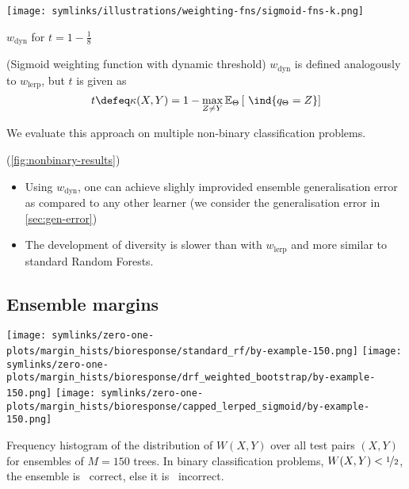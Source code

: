\documentclass[../main.tex]{subfiles}
\begin{document}
\begin{marginfigure}
    \texttt{[image: symlinks/illustrations/weighting-fns/sigmoid-fns-k.png]}
    \caption{ $w_\text{dyn}$ for     $t = 1 - \frac{1}{8}$}
\end{marginfigure}
\begin{definition} (Sigmoid weighting function with dynamic threshold)
    $w_\text{dyn}$ is defined analogously to $w_\text{lerp}$, but $t$ is given as
    $$
    t \defeq \kappa(X,Y) = 1 - \max_{Z \not= Y} \mathbb{E}_{\Theta}\left[ ~\ind{q_{\Theta} = Z} \right] 
    $$
\end{definition}

We evaluate this approach on multiple non-binary classification problems.


\begin{observation}  (\cf \cref{fig:nonbinary-results})
     \begin{itemize}
        \item Using $w_\text{dyn}$, one can achieve slighly improvided ensemble generalisation error as compared to any other learner (we consider the generalisation error in \cref{sec:gen-error})
        \item The development of diversity is slower than with $w_\text{lerp}$ and more similar to standard Random Forests.
     \end{itemize}
\end{observation}

\subsection{Ensemble margins}

\begin{marginfigure}
    \texttt{[image: symlinks/zero-one-plots/margin\_hists/bioresponse/standard\_rf/by-example-150.png]}
    \texttt{[image: symlinks/zero-one-plots/margin\_hists/bioresponse/drf\_weighted\_bootstrap/by-example-150.png]}
    \texttt{[image: symlinks/zero-one-plots/margin\_hists/bioresponse/capped\_lerped\_sigmoid/by-example-150.png]}
    \caption{
        Frequency histogram of the distribution of $W(X,Y)$ over all test pairs $(X,Y)$ for ensembles of $M=150$ trees. In binary classification problems,  $W(X,Y) < \nicefrac{1}{2}$, the ensemble is ~correct, else it is ~incorrect.
    }
    \label{fig:margin_hists}
\end{marginfigure}
\end{document}
